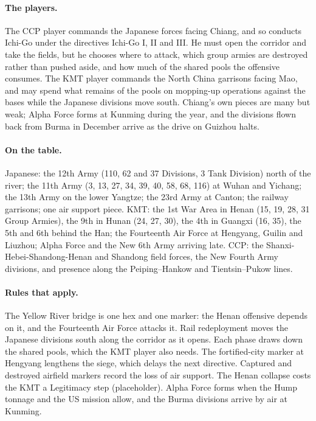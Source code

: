 \documentclass[11pt]{article}
\begin{document}
\paragraph{The players.} The CCP player commands the Japanese forces facing Chiang, and so conducts Ichi-Go under the directives Ichi-Go I, II and III. He must open the corridor and take the fields, but he chooses where to attack, which group armies are destroyed rather than pushed aside, and how much of the shared pools the offensive consumes. The KMT player commands the North China garrisons facing Mao, and may spend what remains of the pools on mopping-up operations against the bases while the Japanese divisions move south. Chiang's own pieces are many but weak; Alpha Force forms at Kunming during the year, and the divisions flown back from Burma in December arrive as the drive on Guizhou halts.
\paragraph{On the table.} Japanese: the 12th Army (110, 62 and 37 Divisions, 3 Tank Division) north of the river; the 11th Army (3, 13, 27, 34, 39, 40, 58, 68, 116) at Wuhan and Yichang; the 13th Army on the lower Yangtze; the 23rd Army at Canton; the railway garrisons; one air support piece. KMT: the 1st War Area in Henan (15, 19, 28, 31 Group Armies), the 9th in Hunan (24, 27, 30), the 4th in Guangxi (16, 35), the 5th and 6th behind the Han; the Fourteenth Air Force at Hengyang, Guilin and Liuzhou; Alpha Force and the New 6th Army arriving late. CCP: the Shanxi-Hebei-Shandong-Henan and Shandong field forces, the New Fourth Army divisions, and presence along the Peiping--Hankow and Tientsin--Pukow lines.
\paragraph{Rules that apply.} The Yellow River bridge is one hex and one marker: the Henan offensive depends on it, and the Fourteenth Air Force attacks it. Rail redeployment moves the Japanese divisions south along the corridor as it opens. Each phase draws down the shared pools, which the KMT player also needs. The fortified-city marker at Hengyang lengthens the siege, which delays the next directive. Captured and destroyed airfield markers record the loss of air support. The Henan collapse costs the KMT a Legitimacy step (placeholder). Alpha Force forms when the Hump tonnage and the US mission allow, and the Burma divisions arrive by air at Kunming.
\clearpage
\end{document}
